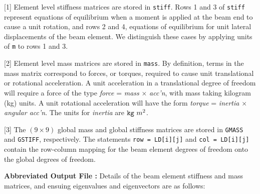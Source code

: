 \begin{description}
\item{[1]}
Element level stiffness matrices are stored in {\tt stiff}.
Rows 1 and 3 of {\tt stiff} represent equations of equilibrium
when a moment is applied at the beam end to cause a unit rotation,
and rows 2 and 4, equations of equilibrium for unit lateral
displacements of the beam element. We distinguish these cases
by applying units of {\tt m} to rows 1 and 3.
\item{[2]}
Element level mass matrices are stored in {\tt mass}.
By definition, terms in the mass matrix correspond to forces, or torques,
required to cause unit translational or rotational acceleration.
A unit acceleration in a translational degree of freedom will
require a force of the type {\it force} = {\it mass} $\times$ {\it acc'n},
with mass taking kilogram (kg) units. A unit rotational acceleration
will have the form {\it torque} = {\it inertia} $\times$ {\it angular acc'n}.
The units for {\it inertia} are ${\tt kg} ~m^2$.
\item{[3]}
The $(9 \times 9)$ global mass and global stiffness matrices are
stored in {\tt GMASS} and {\tt GSTIFF}, respectively.
The statements {\tt row = LD[i][j]} and {\tt col = LD[i][j]}
contain the row-column mapping for the beam element degrees of
freedom onto the global degrees of freedom.
\end{description}

\vspace{0.15 in}\noindent
{\bf Abbreviated Output File :} Details of the beam element stiffness
and mass matrices, and ensuing eigenvalues and eigenvectors are as follows:


